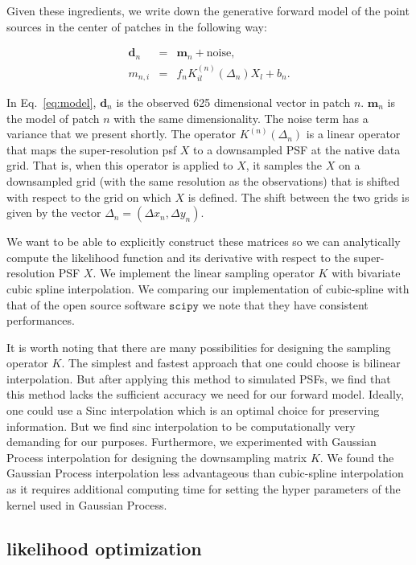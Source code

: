 Given these ingredients, we write down the generative forward model of the point sources in the center of patches in the following way:

\begin{eqnarray}
\mathbf{d}_{n} &=&  \mathbf{m}_{n} + \mathrm{noise}, \\
m_{n,i} &=& f_{n}K^{(n)}_{il} (\Delta_n) X_{l} + b_{n}. 
\label{eq:model}
\end{eqnarray} 

In Eq.~\ref{eq:model}, $\mathbf{d}_{n}$ is the observed 625 dimensional vector in patch $n$. $\mathbf{m}_{n}$ is the model of patch $n$ with the same dimensionality. The 
noise term  has a variance that we present shortly.
The operator $K^{(n)}(\Delta_n)$ is a linear operator that maps the super-resolution psf $X$ to a downsampled PSF at the native 
data grid. That is, when this operator is applied to $X$, it samples the $X$ on a downsampled grid (with the same resolution as the observations) 
that is shifted with respect to the grid on which $X$ is defined. The shift between the two grids is given by the vector $\Delta_n = (\Delta x_n , \Delta y_n)$.


We want to be able to explicitly construct these matrices so we can analytically compute the likelihood function and its derivative with respect to the super-resolution PSF $X$. 
We implement the linear sampling operator $K$ with bivariate cubic spline interpolation. We comparing our implementation of cubic-spline with that of the open source 
software $\mathtt{scipy}$ we note that they have consistent performances.

It is worth noting that there are many possibilities for designing the sampling operator $K$.  The simplest and fastest approach that one could 
choose is bilinear interpolation. But after applying this method to simulated PSFs, we find that this method lacks the sufficient accuracy we 
need for our forward model. Ideally, one could use a Sinc interpolation \citep{bickerton,galsim} which is an optimal choice for preserving information.
But we find sinc interpolation to be computationally very demanding for our purposes. Furthermore, we experimented with Gaussian Process interpolation for designing the downsampling matrix $K$. We found the Gaussian Process interpolation less advantageous than cubic-spline interpolation as it requires additional computing time for setting the hyper parameters of the kernel used in Gaussian Process.

\subsection{likelihood optimization}

